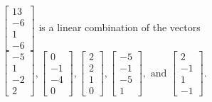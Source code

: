 \begin{exercise}
\begin{exerciseStatement}
  \end{exerciseStatement}
  \begin{exerciseAnswer}
   \(\left[\begin{array}{c}
13 \\
-6 \\
1 \\
-6
\end{array}\right]\) 
  	 is  
	a linear combination of the vectors \(\left[\begin{array}{c}
-5 \\
1 \\
-2 \\
2
\end{array}\right] , \left[\begin{array}{c}
0 \\
-1 \\
-4 \\
0
\end{array}\right] , \left[\begin{array}{c}
2 \\
2 \\
1 \\
0
\end{array}\right] , \left[\begin{array}{c}
-5 \\
-1 \\
-5 \\
1
\end{array}\right] , \text{ and } \left[\begin{array}{c}
2 \\
-1 \\
1 \\
-1
\end{array}\right]\).

	
  


  \end{exerciseAnswer}
\end{exercise}